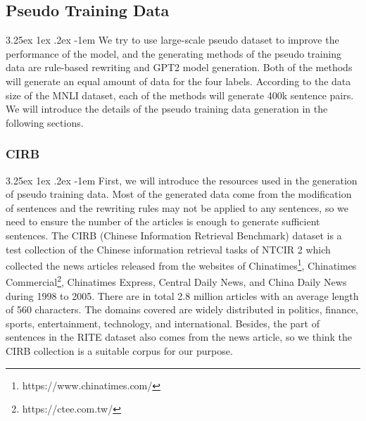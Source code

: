\documentclass[12pt]{article}
\makeatletter
\renewcommand\paragraph{\@startsection{paragraph}{5}{\z@}%
  {3.25ex \@plus1ex \@minus.2ex}%
  {-1em}%
  {\normalfont\normalsize\bfseries}}
\makeatother
\begin{document}
\begin{CJK*}{UTF8}{bkai}
\begin{spacing}{1.77}
\subsection{Pseudo Training Data}
\paragraph{}
We try to use large-scale pseudo dataset to improve the performance of the model, and the generating methods of the pseudo training data are rule-based rewriting and GPT2 model generation. Both of the methods will generate an equal amount of data for the four labels. According to the data size of the MNLI dataset, each of the methods will generate 400k sentence pairs. We will introduce the details of the pseudo training data generation in the following sections.


\subsubsection{CIRB}
\paragraph{}
First, we will introduce the resources used in the generation of pseudo training data. Most of the generated data come from the modification of sentences and the rewriting rules may not be applied to any sentences, so we need to ensure the number of the articles is enough to generate sufficient sentences. The CIRB (Chinese Information Retrieval Benchmark) \cite{chen2001cirb} dataset is a test collection of the Chinese information retrieval tasks of NTCIR 2 which collected the news articles released from the websites of Chinatimes\footnote{https://www.chinatimes.com/}, Chinatimes Commercial\footnote{https://ctee.com.tw/}, Chinatimes Express, Central Daily News, and China Daily News during 1998 to 2005. There are in total 2.8 million articles with an average length of 560 characters. The domains covered are widely distributed in politics, finance, sports, entertainment, technology, and international. Besides, the part of sentences in the RITE dataset also comes from the news article, so we think the CIRB collection is a suitable corpus for our purpose.


\end{spacing}
\end{CJK*}
\end{document}
